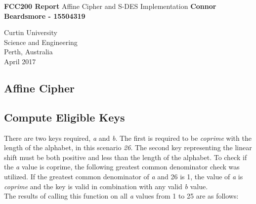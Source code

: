 \documentclass[]{article}
\begin{document}

\begin{titlepage}
	\begin{center}
		\vspace*{1cm}
		\LARGE\textbf{FCC200 Report}
		\break
		Affine Cipher and S-DES Implementation
		\vspace{1cm}
		\break
		\Large\textbf{Connor Beardsmore - 15504319} 
		\vspace{15cm}

		\normalsize
		Curtin University \\
		Science and Engineering \\
		Perth, Australia \\
	    April 2017
	    
	\end{center}
\end{titlepage}


\vspace*{-0.8cm}
\begin{center}
	\section*{Affine Cipher}
\end{center}

\vspace*{0.8cm}
\subsection*{Compute Eligible Keys}

There are two keys required, \textit{a} and \textit{b}. The first is required to be \textit{coprime} with the length of the alphabet, in this scenario \textit{26}. The second key representing the linear shift must be both positive and less than the length of the alphabet. To check if the \textit{a} value is coprime, the following greatest common denominator check was utilized. If the greatest common denominator of \textit{a} and 26 is 1, the value of \textit{a} is \textit{coprime} and the key is valid in combination with any valid \textit{b} value.\\

 

\vspace{0.5cm}
The results of calling this function on all \textit{a} values from 1 to 25 are as follows:\\
\end{document}
